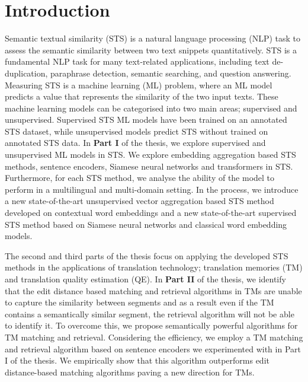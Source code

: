 
\chapter*{Introduction}
\label{cha:introduction}


Semantic textual similarity (STS) is a natural language processing (NLP) task to assess the semantic similarity between two text snippets quantitatively. STS is a fundamental NLP task for many text-related applications, including text de-duplication, paraphrase detection, semantic searching, and question answering. Measuring STS is a machine learning (ML) problem, where an ML model predicts a value that represents the similarity of the two input texts. These machine learning models can be categorised into two main areas; supervised and unsupervised. Supervised STS ML models have been trained on an annotated STS dataset, while unsupervised models predict STS without trained on annotated STS data. In \textbf{Part I} of the thesis, we explore supervised and unsupervised ML models in STS. We explore embedding aggregation based STS methods, sentence encoders, Siamese neural networks and transformers in STS. Furthermore, for each STS method, we analyse the ability of the model to perform in a multilingual and multi-domain setting. In the process, we introduce a new state-of-the-art unsupervised vector aggregation based STS method developed on contextual word embeddings and a new state-of-the-art supervised STS method based on Siamese neural networks and classical word embedding models. 

The second and third parts of the thesis focus on applying the developed STS methods in the applications of translation technology; translation memories (TM) and translation quality estimation (QE). In \textbf{Part II} of the thesis, we identify that the edit distance based matching and retrieval algorithms in TMs are unable to capture the similarity between segments and as a result even if the TM contains a semantically similar segment, the retrieval algorithm will not be able to identify it. To overcome this, we propose semantically powerful algorithms for TM matching and retrieval. Considering the efficiency, we employ a TM matching and retrieval algorithm based on sentence encoders we experimented with in Part I of the thesis. We empirically show that this algorithm outperforms edit distance-based matching algorithms paving a new direction for TMs.

